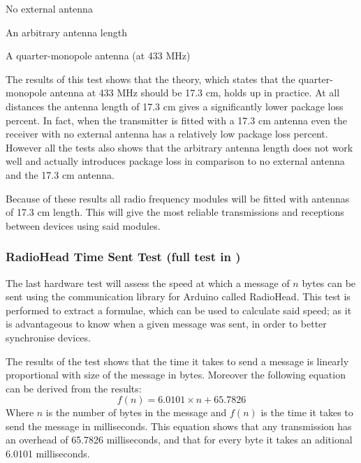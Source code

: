 \begin{description}[labelindent=\parindent, labelwidth=\widthof{\bfseries 17.3 cm}, align=parright]
    \item[0 cm] No external antenna
    \item[12 cm] An arbitrary antenna length
    \item[17.3 cm] A quarter-monopole antenna (at 433 MHz)
\end{description} 

\noindent
The results of this test shows that the theory, which states that the quarter-monopole antenna at 433 MHz should be 17.3 cm, holds up in practice.
At all distances the antenna length of 17.3 cm gives a significantly lower package loss percent.
In fact, when the transmitter is fitted with a 17.3 cm antenna even the receiver with no external antenna has a relatively low package loss percent.
However all the tests also shows that the arbitrary antenna length does not work well and actually introduces package loss in comparison to no external antenna and the 17.3 cm antenna.

Because of these results all radio frequency modules will be fitted with antennas of 17.3 cm length.
This will give the most reliable transmissions and receptions between devices using said modules.

\subsubsection*{RadioHead Time Sent Test (full test in )} %
\label{ssub:radiohead_time_sent_test}
The last hardware test will assess the speed at which a message of $n$ bytes can be sent using the communication library for Arduino called RadioHead.
This test is performed to extract a formulae, which can be used to calculate said speed; as it is advantageous to know when a given message was sent, in order to better synchronise devices.   

The results of the test shows that the time it takes to send a message is linearly proportional with size of the message in bytes.
Moreover the following equation can be derived from the results:
\begin{equation}\label{eq:timeToSendFormular}
f(n)=6.0101 \times n + 65.7826
\end{equation}
Where $n$ is the number of bytes in the message and $f(n)$ is the time it takes to send the message in milliseconds.
This equation shows that any transmission has an overhead of 65.7826 milliseconds, and that for every byte it takes an aditional 6.0101 milliseconds.    

